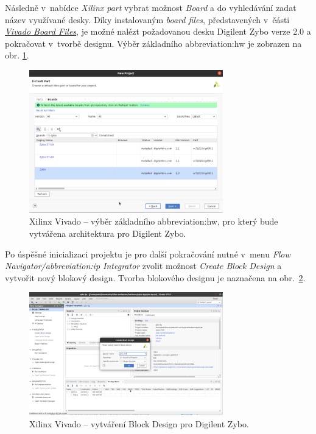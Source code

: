 \documentclass[a4paper, twoside, 11pt]{article}
\begin{document}
\begin{appendices}
		Následně v~nabídce \textit{Xilinx part} vybrat možnost \textit{Board} a do vyhledávání zadat název využívané desky. Díky instalovaným \textit{board files}, představených v~části \hyperref[subsec:vivado-board-files]{\textit{Vivado Board Files}}, je možné nalézt požadovanou desku Digilent Zybo verze 2.0 a pokračovat v~tvorbě designu. Výběr základního \gls{abbreviation:hw} je zobrazen na obr. \ref{fig:zybo-xilinx-vivado-flow-02}.

		\begin{figure}[htbp!]
			\centering
			\includegraphics[width=0.75\textwidth]{src/png/zybo-xilinx-vivado-flow/zybo-xilinx-vivado-flow-02.jpg}
			\caption{Xilinx Vivado – výběr základního \gls{abbreviation:hw}, pro který bude vytvářena architektura pro Digilent Zybo.}
			\label{fig:zybo-xilinx-vivado-flow-02}
		\end{figure}
		
		Po úspěšné inicializaci projektu je pro další pokračování nutné v~menu \textit{Flow Navigator/\gls{abbreviation:ip} Integrator} zvolit možnost \textit{Create Block Design} a vytvořit nový blokový design. Tvorba blokového designu je naznačena na obr.~\ref{fig:zybo-xilinx-vivado-flow-05}.
		
		\begin{figure}[htbp!]
			\centering
			\includegraphics[width=0.75\textwidth]{src/png/zybo-xilinx-vivado-flow/zybo-xilinx-vivado-flow-05.jpg}
			\caption{Xilinx Vivado – vytváření Block Design pro Digilent Zybo.}
			\label{fig:zybo-xilinx-vivado-flow-05}
		\end{figure}


\end{appendices}
\end{document}
